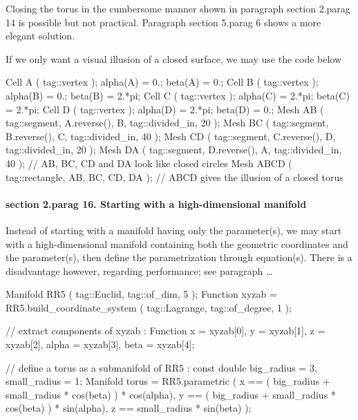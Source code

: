 Closing the torus in the cumbersome manner shown in paragraph \numb section 2.\numb parag 14
is possible but not practical.
Paragraph \numb section 5.\numb parag 6 shows a more elegant solution.

If we only want a visual illusion of a closed surface, we may use the code below

\verbatim
   Cell A ( tag::vertex );  alpha(A) = 0.;     beta(A) = 0.;
   Cell B ( tag::vertex );  alpha(B) = 0.;     beta(B) = 2.*pi;
   Cell C ( tag::vertex );  alpha(C) = 2.*pi;  beta(C) = 2.*pi;
   Cell D ( tag::vertex );  alpha(D) = 2.*pi;  beta(D) = 0.;
   Mesh AB ( tag::segment, A.reverse(), B, tag::divided_in, 20 );
   Mesh BC ( tag::segment, B.reverse(), C, tag::divided_in, 40 );
   Mesh CD ( tag::segment, C.reverse(), D, tag::divided_in, 20 );
   Mesh DA ( tag::segment, D.reverse(), A, tag::divided_in, 40 );
   // AB, BC, CD and DA look like closed circles
   Mesh ABCD ( tag::rectangle, AB, BC, CD, DA );
   // ABCD gives the illusion of a closed torus
\endverbatim


\paragraph{\numb section 2.\numb parag 16. Starting with a high-dimensional manifold}

Instead of starting with a manifold having only the parameter(s), we may start with a
high-dimensional manifold containing both the geometric coordinates and the parameter(s),
then define the parametrization through equation(s).
There is a disadvantage however, regarding performance; see paragraph \dots

\verbatim
   Manifold RR5 ( tag::Euclid, tag::of_dim, 5 );
   Function xyzab = RR5.build_coordinate_system ( tag::Lagrange, tag::of_degree, 1 );

   // extract components of xyzab :
   Function x = xyzab[0], y = xyzab[1], z = xyzab[2], alpha = xyzab[3], beta = xyzab[4];

   // define a torus as a submanifold of RR5 :
   const double big_radius = 3, small_radius = 1;
   Manifold torus = RR5.parametric
      ( x == ( big_radius + small_radius * cos(beta) ) * cos(alpha),
        y == ( big_radius + small_radius * cos(beta) ) * sin(alpha),
        z == small_radius * sin(beta)                                );

